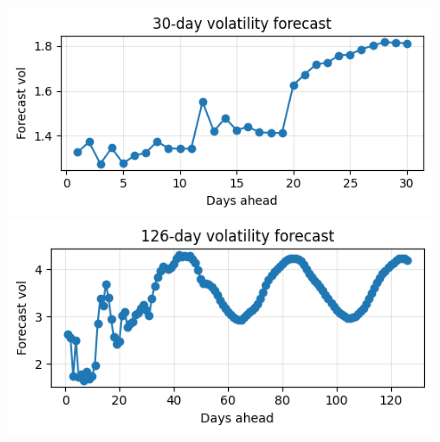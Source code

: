 \documentclass[letterpaper,11pt]{article}
\begin{document}
\begin{figure}[H]
    \centering
    \begin{minipage}[b]{0.49\textwidth}
      \centering
      \includegraphics[width=\linewidth]{img/30_vol_forecast.png} 
    \end{minipage}
    \hfill
    \begin{minipage}[b]{0.49\textwidth}
      \centering
      \includegraphics[width=\linewidth]{img/126_vol_forecast.png}
    \end{minipage}
  \end{figure}
\end{document}
